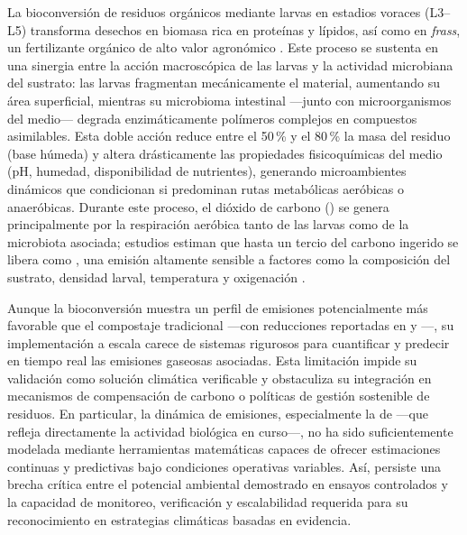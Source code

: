 La bioconversión de residuos orgánicos mediante larvas en estadios voraces (L3--L5) transforma desechos en biomasa rica en proteínas y lípidos, así como en \textit{frass}, un fertilizante orgánico de alto valor agronómico \parencite{surendraBioconversionOrganicWastes2016,bermudez-serranoComprehensiveUtilizationBlack2023,singhInclusiveApproachOrganic2019a}. Este proceso se sustenta en una sinergia entre la acción macroscópica de las larvas y la actividad microbiana del sustrato: las larvas fragmentan mecánicamente el material, aumentando su área superficial, mientras su microbioma intestinal ---junto con microorganismos del medio--- degrada enzimáticamente polímeros complejos en compuestos asimilables. Esta doble acción reduce entre el 50\,\% y el 80\,\% la masa del residuo (base húmeda) y altera drásticamente las propiedades fisicoquímicas del medio (pH, humedad, disponibilidad de nutrientes), generando microambientes dinámicos que condicionan si predominan rutas metabólicas aeróbicas o anaeróbicas. Durante este proceso, el dióxido de carbono () se genera principalmente por la respiración aeróbica tanto de las larvas como de la microbiota asociada; estudios estiman que hasta un tercio del carbono ingerido se libera como  \parencite{dienerConversionOrganicMaterial2011}, una emisión altamente sensible a factores como la composición del sustrato, densidad larval, temperatura y oxigenación \parencite{rossiEstimatingDynamicsGreenhouse2024a,bekkerImpactSubstrateMoisture2021a,eriksenDynamicModellingFeed2022}.

Aunque la bioconversión muestra un perfil de emisiones potencialmente más favorable que el compostaje tradicional ---con reducciones reportadas en  y  \parencite{jenkinsProcessingPoultryManure2025}---, su implementación a escala carece de sistemas rigurosos para cuantificar y predecir en tiempo real las emisiones gaseosas asociadas. Esta limitación impide su validación como solución climática verificable y obstaculiza su integración en mecanismos de compensación de carbono o políticas de gestión sostenible de residuos. En particular, la dinámica de emisiones, especialmente la de  ---que refleja directamente la actividad biológica en curso---, no ha sido suficientemente modelada mediante herramientas matemáticas capaces de ofrecer estimaciones continuas y predictivas bajo condiciones operativas variables. Así, persiste una brecha crítica entre el potencial ambiental demostrado en ensayos controlados y la capacidad de monitoreo, verificación y escalabilidad requerida para su reconocimiento en estrategias climáticas basadas en evidencia.

